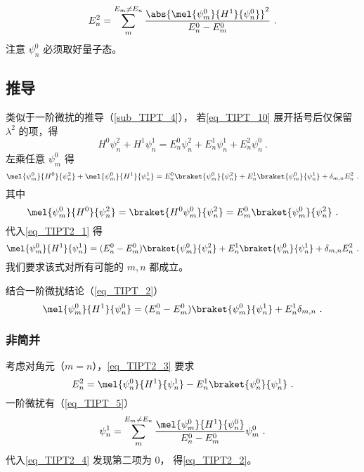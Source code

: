 
\begin{issues}
\issueDraft
\end{issues}


\begin{equation}\label{eq_TIPT2_2}
E_n^2 = \sum_{m}^{E_m\ne E_n} \frac{\abs{\mel{\psi_m^0}{H^1}{\psi_n^0}}^2}{E_n^0-E_m^0}~.
\end{equation}
注意 $\psi_n^0$ 必须取好量子态。

\subsection{推导}
类似于一阶微扰的推导（\autoref{sub_TIPT_4}）， 若\autoref{eq_TIPT_10} 展开括号后仅保留 $\lambda^2$ 的项，得
\begin{equation}
H^0\psi_n^2 + H^1\psi_n^1 = E_n^0\psi_n^2 + E_n^1\psi_n^1 + E_n^2\psi_n^0~.
\end{equation}
左乘任意 $\psi_m^0$ 得
\begin{equation}\label{eq_TIPT2_1}
\mel{\psi_m^0}{H^0}{\psi_n^2} + \mel{\psi_m^0}{H^1}{\psi_n^1} = E_n^0\braket{\psi_m^0}{\psi_n^2} + E_n^1\braket{\psi_m^0}{\psi_n^1} + \delta_{m,n}E_n^2~.
\end{equation}
其中
\begin{equation}
\mel{\psi_m^0}{H^0}{\psi_n^2} = \braket{H^0\psi_m^0}{\psi_n^2} = E_m^0\braket{\psi_m^0}{\psi_n^2}~.
\end{equation}
代入\autoref{eq_TIPT2_1} 得
\begin{equation}\label{eq_TIPT2_3}
\mel{\psi_m^0}{H^1}{\psi_n^1} = (E_n^0-E_m^0)\braket{\psi_m^0}{\psi_n^2} + E_n^1\braket{\psi_m^0}{\psi_n^1} + \delta_{m,n}E_n^2~.
\end{equation}
我们要求该式对所有可能的 $m,n$ 都成立。

结合一阶微扰结论（\autoref{eq_TIPT_2}）
\begin{equation}
\mel{\psi_m^0}{H^1}{\psi_n^0} = (E_n^0 - E_m^0) \braket{\psi_m^0}{\psi_n^1} + E_n^1 \delta_{m,n}~.
\end{equation}

\subsubsection{非简并}
考虑对角元（$m=n$），\autoref{eq_TIPT2_3} 要求
\begin{equation}\label{eq_TIPT2_4}
E_n^2 = \mel{\psi_n^0}{H^1}{\psi_n^1} - E_n^1\braket{\psi_n^0}{\psi_n^1}~.
\end{equation}
一阶微扰有（\autoref{eq_TIPT_5}）
\begin{equation}
\psi_n^1 = \sum_m^{E_m\ne E_n} \frac{\mel{\psi_m^0}{H^1}{\psi_n^0}}{E_n^0 - E_m^0}\psi_m^0~.
\end{equation}
代入\autoref{eq_TIPT2_4} 发现第二项为 0， 得\autoref{eq_TIPT2_2}。


